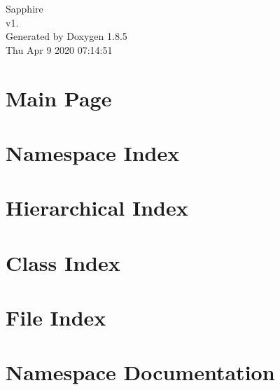 \documentclass[twoside]{book}
\newcommand{\clearemptydoublepage}{%
  \newpage{\pagestyle{empty}\cleardoublepage}%
}
\begin{document}
\hypersetup{pageanchor=false}
\begin{titlepage}
\vspace*{7cm}
\begin{center}%
{\Large Sapphire \\[1ex]\large v1. }\\
\vspace*{1cm}
{\large Generated by Doxygen 1.8.5}\\
\vspace*{0.5cm}
{\small Thu Apr 9 2020 07:14:51}\\
\end{center}
\end{titlepage}
\clearemptydoublepage
\tableofcontents
\clearemptydoublepage
{}
\hypersetup{pageanchor=true}

\chapter{Main Page}
\label{index}\hypertarget{index}{}
\chapter{Namespace Index}

\chapter{Hierarchical Index}

\chapter{Class Index}

\chapter{File Index}

\chapter{Namespace Documentation}




\end{document}

